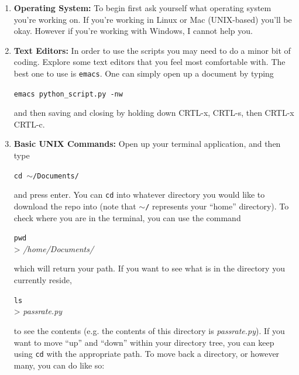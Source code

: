 \documentclass[12pt]{article}
\begin{document}
\begin{enumerate}

\item \textbf{Operating System: }To begin first ask yourself what operating system you're working on. If you're working in Linux or Mac (UNIX-based) you'll be okay. However if you're working with Windows, I cannot help you.

\item \textbf{Text Editors:} In order to use the scripts you may need to do a minor bit of coding. Explore some text editors that you feel most comfortable with. The best one to use is \texttt{emacs}. One can simply open up a document by typing

\begin{mdframed}[style=CommandFrame]
\texttt{emacs python\_script.py -nw}
\end{mdframed}

and then saving and closing by holding down CRTL-x, CRTL-s, then CRTL-x CRTL-c.

\item \textbf{Basic UNIX Commands:} Open up your terminal application, and then type

\begin{mdframed}[style=CommandFrame]
\texttt{cd $\sim$/Documents/}
\end{mdframed}

\noindent and press enter. You can \texttt{cd} into whatever directory you would like to download the repo into (note that \texttt{$\sim$/} represents your ``home'' directory). To check where you are in the terminal, you can use the command

\begin{mdframed}[style=CommandFrame]
\texttt{pwd}\\
> \emph{/home/Documents/}
\end{mdframed}

\noindent which will return your path. If you want to see what is in the directory you currently reside,

\begin{mdframed}[style=CommandFrame]
\texttt{ls} \\
> \emph{passrate.py}
\end{mdframed}

\noindent to see the contents (e.g. the contents of this directory is \emph{passrate.py}). If you want to move ``up'' and ``down'' within your directory tree, you can keep using \texttt{cd} with the appropriate path. To move back a directory, or however many, you can do like so:


\end{enumerate}
\end{document}
